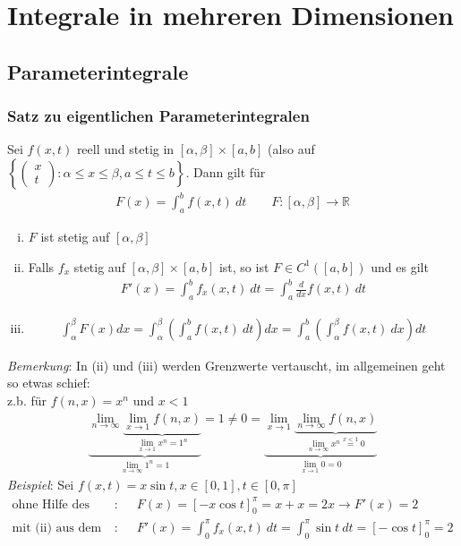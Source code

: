\documentclass[11pt,a4paper]{book}
\newcommand {\R}	{\mathbb{R}}
\newcommand{\1}    	{\mathbbm{1}}
\newcommand{\Bemerkung}	{\noindent\textit{Bemerkung}: }
\begin{document}
\chapter{Integrale in mehreren Dimensionen}
\section{Parameterintegrale}
\subsection{Satz zu eigentlichen Parameterintegralen}\label{sec:eigtl_param_int}
Sei \(f(x,t)\) reell und stetig in \([\alpha,\beta]\times[a,b]\) (also auf \(\left\{ \left( \begin{array}{c} x \\ t \end{array}\right) : \alpha \leqslant x \leqslant \beta, a \leqslant t \leqslant b \right\}\). Dann gilt für
\begin{align*}
	F(x) = \int_a^b f(x,t) ~dt \qquad F:[\alpha,\beta] \rightarrow \R
\end{align*}
\begin{enumerate}[(i)]
	\item \(F\) ist stetig auf \([\alpha,\beta]\)
	\item Falls \(f_x\) stetig auf \([\alpha,\beta]\times[a,b]\) ist, so ist \(F \in C^1([a,b])\) und es gilt
	\begin{align*}
		F'(x) = \int_a^b f_x(x,t) ~dt = \int_a^b \frac{d}{dx} f(x,t) ~dt
	\end{align*}
	\item \begin{align*}
		\int_\alpha^\beta F(x) dx = 
		\int_\alpha^\beta \left( \int_a^b f(x,t) ~dt \right) dx =
		\int_a^b \left( \int_\alpha^\beta f(x,t) ~dx \right) dt
	\end{align*}
\end{enumerate}
\Bemerkung In (ii) und (iii) werden Grenzwerte vertauscht, im allgemeinen geht so etwas schief:\\
z.b. für \(f(n,x)=x^n\) und \(x < 1\)
\begin{align*}
	\underbrace{
		\lim_{n \rightarrow \infty} 
		\underbrace{
			\lim_{x \rightarrow 1} f(n,x)
		}_{
			\lim_{x \rightarrow 1} x^n = 1^n
		}
	}_{
		\lim_{n \rightarrow \infty} 1^n = 1
	} = 1 \neq 0 =
	\underbrace{
		\lim_{x \rightarrow 1} 
		\underbrace{
			\lim_{n \rightarrow \infty} f(n,x)
		}_{
			\lim_{n \rightarrow \infty} x^n \stackrel{x < 1}{=} 0
		}
	}_{
		\lim_{x \rightarrow 1} 0 = 0
	}
\end{align*}
\textit{Beispiel}: Sei \(f(x,t) = x \sin t, x \in [0,1], t \in [0,\pi]\)
\begin{align*}
	\textrm{ohne Hilfe des Satzes}: &\quad
	F(x) = \left[ - x \cos t \right]_0^\pi = x + x = 2x \rightarrow F'(x) = 2 \\
	\textrm{mit (ii) aus dem Satz}: &\quad
	F'(x) = \int_0^\pi f_x(x,t) ~dt = \int_0^\pi \sin t ~dt = \left[ -\cos t \right]_0^\pi = 2
\end{align*}
\end{document}
